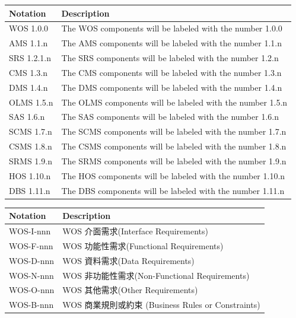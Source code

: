 \documentclass[a4paper, 12pt]{article}
\begin{document}
\noindent \begin{tabular}{ | p{6.5em} | p{32em} |}
  \hline
  Notation & Description \\
  \hline
  WOS 1.0.0 & The WOS components will be labeled with the number 1.0.0 \\
  AMS 1.1.n & The AMS components will be labeled with the number 1.1.n \\
  SRS 1.2.1.n & The SRS components will be labeled with the number 1.2.n \\
  CMS 1.3.n & The CMS components will be labeled with the number 1.3.n \\
  DMS 1.4.n & The DMS components will be labeled with the number 1.4.n \\
  OLMS 1.5.n & The OLMS components will be labeled with the number 1.5.n \\
  SAS 1.6.n & The SAS components will be labeled with the number 1.6.n \\
  SCMS 1.7.n & The SCMS components will be labeled with the number 1.7.n \\
  CSMS 1.8.n & The CSMS components will be labeled with the number 1.8.n \\
  SRMS 1.9.n & The SRMS components will be labeled with the number 1.9.n \\
  HOS 1.10.n & The HOS components will be labeled with the number 1.10.n \\
  DBS 1.11.n & The DBS components will be labeled with the number 1.11.n \\
  \hline
\end{tabular} \par

\noindent \begin{tabular}{ | p{6.5em} | p{32em} |}
  \hline
  Notation & Description \\
  \hline
  WOS-I-nnn & WOS 介面需求(Interface Requirements) \\
  WOS-F-nnn & WOS 功能性需求(Functional Requirements) \\
  WOS-D-nnn & WOS 資料需求(Data Requirements) \\
  WOS-N-nnn & WOS 非功能性需求(Non-Functional Requirements) \\
  WOS-O-nnn & WOS 其他需求(Other Requirements) \\
  WOS-B-nnn & WOS 商業規則或約束 (Business Rules or Constraints) \\
  \hline
\end{tabular} \par
\end{document}

